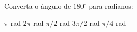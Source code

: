 Converta o ângulo de $180^\circ$ para radianos:

\parbox{\linewidth}{

$\pi$ rad
$2\pi$ rad
$\pi/2$ rad
$3\pi/2$ rad
$\pi/4$ rad

}


